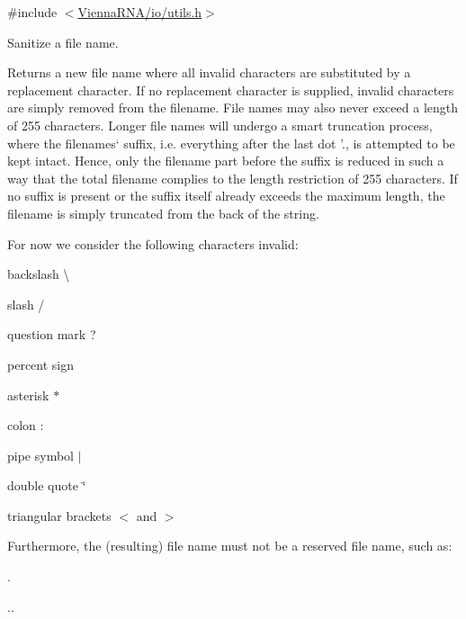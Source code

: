 {\ttfamily \#include $<$\mbox{\hyperlink{io_2utils_8h}{Vienna\+R\+N\+A/io/utils.\+h}}$>$}



Sanitize a file name. 

Returns a new file name where all invalid characters are substituted by a replacement character. If no replacement character is supplied, invalid characters are simply removed from the filename. File names may also never exceed a length of 255 characters. Longer file names will undergo a \textquotesingle{}smart\textquotesingle{} truncation process, where the filenames` suffix, i.\+e. everything after the last dot '.\textquotesingle{}, is attempted to be kept intact. Hence, only the filename part before the suffix is reduced in such a way that the total filename complies to the length restriction of 255 characters. If no suffix is present or the suffix itself already exceeds the maximum length, the filename is simply truncated from the back of the string.

For now we consider the following characters invalid\+:
\begin{DoxyItemize}
\item backslash \textquotesingle{}\textbackslash{}\textquotesingle{}
\item slash \textquotesingle{}/\textquotesingle{}
\item question mark \textquotesingle{}?\textquotesingle{}
\item percent sign \textquotesingle{}\textquotesingle{}
\item asterisk \textquotesingle{}$\ast$\textquotesingle{}
\item colon \textquotesingle{}\+:\textquotesingle{}
\item pipe symbol \textquotesingle{}$\vert$\textquotesingle{}
\item double quote \textquotesingle{}\char`\"{}\textquotesingle{}
\item triangular brackets \textquotesingle{}$<$\textquotesingle{} and \textquotesingle{}$>$\textquotesingle{}
\end{DoxyItemize}

Furthermore, the (resulting) file name must not be a reserved file name, such as\+:
\begin{DoxyItemize}
\item \textquotesingle{}.\textquotesingle{}
\item \textquotesingle{}..\textquotesingle{}
\end{DoxyItemize}

